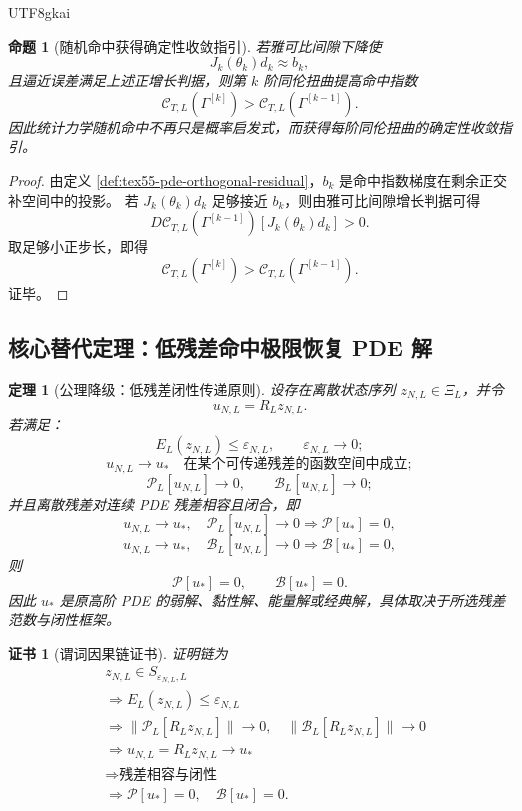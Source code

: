 \documentclass[12pt]{article}
\newtheorem{theorem}{定理}[section]
\newtheorem{proposition}{命题}[section]
\newtheorem{Certificate}{证书}[section]
\begin{document}
\begin{CJK*}{UTF8}{gkai}
\begin{proposition}[随机命中获得确定性收敛指引]
\label{prop:tex55-pde-deterministic-guide}
若雅可比间隙下降使
\[
  J_k(\theta_k)d_k\approx b_k,
\]
且逼近误差满足上述正增长判据，则第 \(k\) 阶同伦扭曲提高命中指数
\[
  \mathcal C_{T,L}(\Gamma^{[k]})
  >
  \mathcal C_{T,L}(\Gamma^{[k-1]}).
\]
因此统计力学随机命中不再只是概率启发式，而获得每阶同伦扭曲的确定性收敛指引。
\end{proposition}

\begin{proof}
由定义 \ref{def:tex55-pde-orthogonal-residual}，\(b_k\) 是命中指数梯度在剩余正交补空间中的投影。
若 \(J_k(\theta_k)d_k\) 足够接近 \(b_k\)，则由雅可比间隙增长判据可得
\[
  D\mathcal C_{T,L}(\Gamma^{[k-1]})[J_k(\theta_k)d_k]>0.
\]
取足够小正步长，即得
\[
  \mathcal C_{T,L}(\Gamma^{[k]})
  >
  \mathcal C_{T,L}(\Gamma^{[k-1]}).
\]
证毕。
\end{proof}

\subsection{核心替代定理：低残差命中极限恢复 PDE 解}
\label{subsec:tex55-pde-core-replacement-theorem}

\begin{theorem}[公理降级：低残差闭性传递原则]
\label{thm:tex55-pde-residual-closedness}
设存在离散状态序列 \(z_{N,L}\in\Xi_L\)，并令
\[
  u_{N,L}=R_Lz_{N,L}.
\]
若满足：
\[
  E_L(z_{N,L})\le\varepsilon_{N,L},
  \qquad
  \varepsilon_{N,L}\to0;
\]
\[
  u_{N,L}\to u_*
  \quad
  \text{在某个可传递残差的函数空间中成立};
\]
\[
  \mathcal P_L[u_{N,L}]\to0,
  \qquad
  \mathcal B_L[u_{N,L}]\to0;
\]
并且离散残差对连续 PDE 残差相容且闭合，即
\[
  u_{N,L}\to u_*,
  \quad
  \mathcal P_L[u_{N,L}]\to0
  \Longrightarrow
  \mathcal P[u_*]=0,
\]
\[
  u_{N,L}\to u_*,
  \quad
  \mathcal B_L[u_{N,L}]\to0
  \Longrightarrow
  \mathcal B[u_*]=0,
\]
则
\[
  \mathcal P[u_*]=0,
  \qquad
  \mathcal B[u_*]=0.
\]
因此 \(u_*\) 是原高阶 PDE 的弱解、黏性解、能量解或经典解，具体取决于所选残差范数与闭性框架。
\end{theorem}

\begin{Certificate}[谓词因果链证书]
\label{cert:tex55-pde-residual-closedness}
证明链为
\[
\begin{aligned}
  &z_{N,L}\in S_{\varepsilon_{N,L},L}\\
  &\Longrightarrow
  E_L(z_{N,L})\le\varepsilon_{N,L}\\
  &\Longrightarrow
  \lVert\mathcal P_L[R_Lz_{N,L}]\rVert\to0,
  \quad
  \lVert\mathcal B_L[R_Lz_{N,L}]\rVert\to0\\
  &\Longrightarrow
  u_{N,L}=R_Lz_{N,L}\to u_*\\
  &\Longrightarrow
  \text{残差相容与闭性}\\
  &\Longrightarrow
  \mathcal P[u_*]=0,\quad
  \mathcal B[u_*]=0.
\end{aligned}
\]
\end{Certificate}


\end{CJK*}
\end{document}
